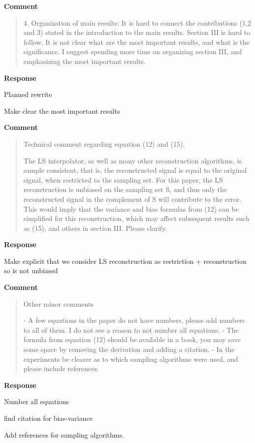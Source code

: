 \documentclass[11pt,onecolumn,journal]{IEEEtran}
\newcommand{\cmark}{\ding{51}}%
\newcommand{\done}{\rlap{$\square$}{\raisebox{2pt}{\large\hspace{1pt}\cmark}}%
\hspace{-2.5pt}}
\begin{document}
\textbf{Comment}
\begin{quote}
4. Organization of main results:  It is hard to connect the contributions (1,2 and 3) stated in the introduction to the main results. Section III is hard to follow. It is not clear what are the most important results, and what is the significance. I suggest spending more time on organizing section III, and emphasizing the most important results.
\end{quote}

\textbf{Response}
\begin{todolist}
    \item Planned rewrite
    \item Make clear the most important results
\end{todolist}

\textbf{Comment}
\begin{quote}
Technical comment regarding equation (12) and (15).

The LS interpolator, as well as many other reconstruction algorithms, is sample consistent, that is, the reconstructed signal is equal to the original signal, when restricted to the sampling set.  For this paper, the LS reconstruction is unbiased on the sampling set S, and thus only the reconstructed signal in the complement of S will contribute to the error. This would imply that the variance and bias formulas from (12) can be simplified for this reconstruction, which may affect subsequent results such as (15), and others in section III. Please clarify.
\end{quote}

\textbf{Response}
\begin{todolist}
    \item Make explicit that we consider LS reconstruction as restriction + reconstruction so is not unbiased
\end{todolist}

\textbf{Comment}
\begin{quote}
Other minor comments

- A few equations in the paper do not have numbers, please add numbers to all of them.  I do not see a reason to not number all equations.
- The formula from equation (12) should be available in a book, you may save some space by removing the derivation and adding a citation.
- In the experiments be clearer as to which sampling algorithms were used, and please include references.
\end{quote}

\textbf{Response}
\begin{todolist}
    \item Number all equations
    \item[\done] find citation for bias-variance
    \item Add references for sampling algorithms.
\end{todolist}
\end{document}
